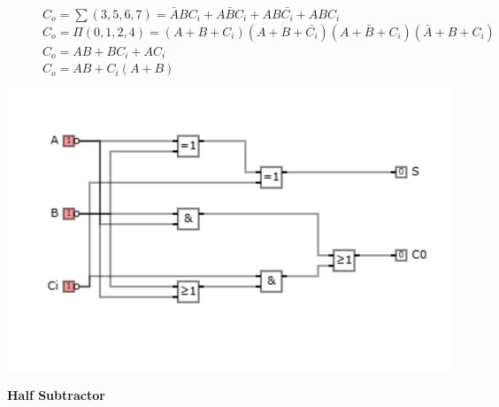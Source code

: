 \documentclass[12pt]{article}
\begin{document}
\begin{figure}[h!]
    \begin{minipage}{0.6\textwidth}
        $C_{o}=\sum(3,5,6,7)=\bar{A}BC_{i}+A\bar{B}C_{i}+AB\bar{C_{i}}+ABC_{i}$\\
       $C_{o}=\Pi(0,1,2,4)=(A+B+C_i)(A+B+\bar{C_i})(A+\bar{B}+C_i)(\bar{A}+B+C_i)$\\
       $C_{o}=AB+BC_i+AC_i$\\
       $C_{o}=AB+C_{i}(A+B)$\\
    \end{minipage}
    \hfill
    \begin{minipage}{0.3\textwidth}
    \end{minipage}
\end{figure}

\begin{minipage}{1\textwidth}
    \includegraphics[scale=0.6]{Schema2.png}
\end{minipage}

\newpage
\begin{center}
    \large{\textbf{Half Subtractor}}
\end{center}
\end{document}
